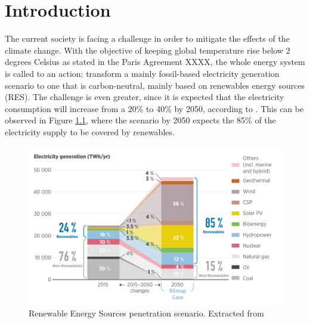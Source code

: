 \renewcommand\labelenumi{(\roman{enumi})}
\renewcommand\theenumi\labelenumi

\chapter{Introduction}
\label{chapterIntro}

The current society is facing a challenge in order to mitigate the effects of the climate change. With the objective of keeping global temperature rise below 2 degrees Celsius as stated in the Paris Agreement XXXX, the whole energy system is called to an action: transform a mainly fossil-based electricity generation scenario to one that is carbon-neutral, mainly based on renewables energy sources (RES). The challenge is even greater, since it is expected that the electricity consumption will increase from a 20\% to 40\% by 2050, according to \cite{IRENA2018}. This can be observed in Figure \ref{fig:scenarios}, where the scenario by 2050 expects the 85\% of the electricity supply to be covered by renewables. 

\begin{figure}[]
	\centering 
	\includegraphics[width=1\columnwidth ]{ChapterIntro/Figures/irena_scenarios.png}
		\caption{Renewable Energy Sources penetration scenario. Extracted from \cite{IRENA2018}}  
		\label{fig:scenarios}
\end{figure}

